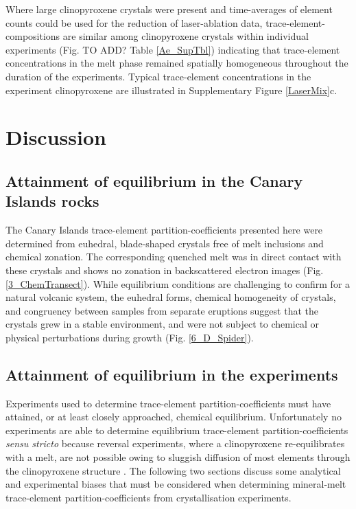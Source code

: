 \documentclass[review,authoryear,12pt]{elsarticle}
\begin{document}
Where large clinopyroxene crystals were present and time-averages of element counts could be used for the reduction of laser-ablation data, trace-element-compositions are similar among clinopyroxene crystals within individual experiments (Fig. TO ADD? Table \ref{Ae_SupTbl}) indicating that trace-element concentrations in the melt phase remained spatially homogeneous throughout the duration of the experiments. Typical trace-element concentrations in the experiment clinopyroxene are illustrated in Supplementary Figure \ref{LaserMix}c.

	

\section{Discussion}
\subsection{Attainment of equilibrium in the Canary Islands rocks}
The Canary Islands trace-element partition-coefficients presented here were determined from euhedral, blade-shaped crystals free of melt inclusions and chemical zonation. The corresponding quenched melt was in direct contact with these crystals and shows no zonation in backscattered electron images (Fig. \ref{3_ChemTransect}). While equilibrium conditions are challenging to confirm for a natural volcanic system, the euhedral forms, chemical homogeneity of crystals, and congruency between samples from separate eruptions suggest that the crystals grew in a stable environment, and were not subject to chemical or physical perturbations during growth (Fig. \ref{6_D_Spider}).	

\subsection{Attainment of equilibrium in the experiments}
Experiments used to determine trace-element partition-coefficients must have attained, or at least closely approached, chemical equilibrium. Unfortunately no experiments are able to determine equilibrium trace-element partition-coefficients \emph{sensu stricto} because reversal experiments, where a clinopyroxene re-equilibrates with a melt, are not possible owing to sluggish diffusion of most elements through the clinopyroxene structure \citep{VanOrman2001,Zhang2010}.
     The following two sections discuss some analytical and experimental biases that must be considered when determining mineral-melt trace-element partition-coefficients from crystallisation experiments.
\end{document}
